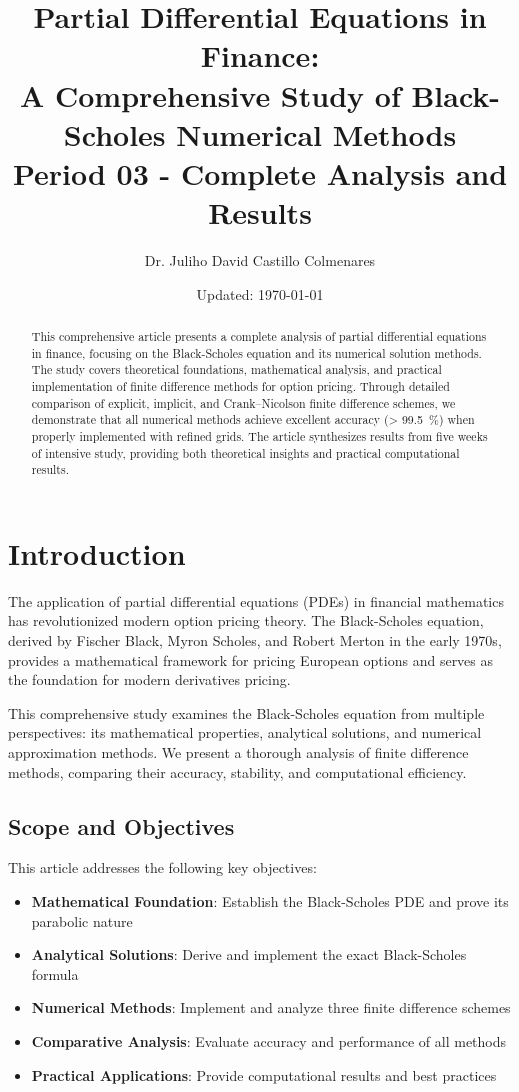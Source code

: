 \documentclass[12pt,a4paper]{article}
\title{\textbf{Partial Differential Equations in Finance: \\
A Comprehensive Study of Black-Scholes Numerical Methods} \\
\large Period 03 - Complete Analysis and Results}
\author{Dr. Juliho David Castillo Colmenares}
\date{Updated: \today}
\numberwithin{algorithm}{subsection}
\begin{document}
\maketitle

\begin{abstract}
This comprehensive article presents a complete analysis of partial differential equations in finance, focusing on the Black-Scholes equation and its numerical solution methods. The study covers theoretical foundations, mathematical analysis, and practical implementation of finite difference methods for option pricing. Through detailed comparison of explicit, implicit, and Crank–Nicolson finite difference schemes, we demonstrate that all numerical methods achieve excellent accuracy (> \SI{99.5}{\percent}) when properly implemented with refined grids. The article synthesizes results from five weeks of intensive study, providing both theoretical insights and practical computational results.
\end{abstract}

\tableofcontents
\listoffigures
\newpage
\listoftables
\newpage

\section{Introduction}
\label{sec:introduction}

The application of partial differential equations (PDEs) in financial mathematics has revolutionized modern option pricing theory. The Black-Scholes equation, derived by Fischer Black, Myron Scholes, and Robert Merton in the early 1970s, provides a mathematical framework for pricing European options and serves as the foundation for modern derivatives pricing.

This comprehensive study examines the Black-Scholes equation from multiple perspectives: its mathematical properties, analytical solutions, and numerical approximation methods. We present a thorough analysis of finite difference methods, comparing their accuracy, stability, and computational efficiency.

\subsection{Scope and Objectives}

This article addresses the following key objectives:

\begin{itemize}
\item \textbf{Mathematical Foundation}: Establish the Black-Scholes PDE and prove its parabolic nature
\item \textbf{Analytical Solutions}: Derive and implement the exact Black-Scholes formula
\item \textbf{Numerical Methods}: Implement and analyze three finite difference schemes
\item \textbf{Comparative Analysis}: Evaluate accuracy and performance of all methods
\item \textbf{Practical Applications}: Provide computational results and best practices
\end{itemize}
\end{document}
